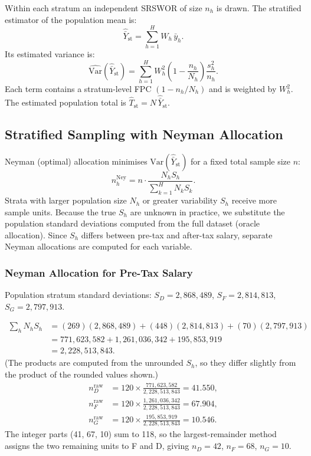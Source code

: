 \documentclass[12pt]{article}
\newcommand{\VarHat}{\widehat{\mathrm{Var}}}
\begin{document}
Within each stratum an independent SRSWOR of size $n_h$ is drawn.
The stratified estimator of the population mean is:
\[
  \hat{\bar{Y}}_{\mathrm{st}} = \sum_{h=1}^{H} W_h\,\bar{y}_h.
\]
Its estimated variance is:
\[
  \VarHat\!\left(\hat{\bar{Y}}_{\mathrm{st}}\right)
  = \sum_{h=1}^{H} W_h^2 \left(1 - \frac{n_h}{N_h}\right)\frac{s_h^2}{n_h}.
\]
Each term contains a stratum-level FPC $(1 - n_h/N_h)$ and is weighted by $W_h^2$.
The estimated population total is $\hat{T}_{\mathrm{st}} = N\,\hat{\bar{Y}}_{\mathrm{st}}$.

\subsection{Stratified Sampling with Neyman Allocation}
\label{sec:neyman}

Neyman (optimal) allocation minimises $\mathrm{Var}(\hat{\bar{Y}}_{\mathrm{st}})$
for a fixed total sample size $n$:
\[
  n_h^{\mathrm{Ney}} = n \cdot \frac{N_h S_h}{\displaystyle\sum_{k=1}^{H} N_k S_k}.
\]
Strata with larger population size $N_h$ or greater variability $S_h$ receive more
sample units. Because the true $S_h$ are unknown in practice, we substitute the
population standard deviations computed from the full dataset (oracle allocation).
Since $S_h$ differs between pre-tax and after-tax salary, separate Neyman allocations
are computed for each variable.

\subsubsection*{Neyman Allocation for Pre-Tax Salary}

Population stratum standard deviations:
$S_D = 2{,}868{,}489$, $S_F = 2{,}814{,}813$, $S_G = 2{,}797{,}913$.

\begin{align*}
  \sum_h N_h S_h
  &= (269)(2{,}868{,}489) + (448)(2{,}814{,}813) + (70)(2{,}797{,}913) \\
  &= 771{,}623{,}582 + 1{,}261{,}036{,}342 + 195{,}853{,}919 \\
  &= 2{,}228{,}513{,}843.
\end{align*}
(The products are computed from the unrounded $S_h$, so they differ slightly from
the product of the rounded values shown.)
\begin{align*}
  n_D^{\text{raw}} &= 120 \times \frac{771{,}623{,}582}{2{,}228{,}513{,}843} = 41.550, \\[4pt]
  n_F^{\text{raw}} &= 120 \times \frac{1{,}261{,}036{,}342}{2{,}228{,}513{,}843} = 67.904, \\[4pt]
  n_G^{\text{raw}} &= 120 \times \frac{195{,}853{,}919}{2{,}228{,}513{,}843} = 10.546.
\end{align*}
The integer parts (41, 67, 10) sum to 118, so the largest-remainder method assigns the
two remaining units to F and D, giving $n_D = 42$, $n_F = 68$, $n_G = 10$.
\end{document}

